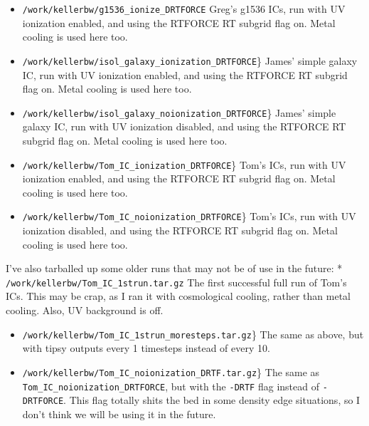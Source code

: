 \documentclass[11pt,letterpaper]{article}
\begin{document}
\begin{itemize}
\item
  \texttt{/work/kellerbw/g1536\_ionize\_DRTFORCE} Greg's g1536 ICs, run
  with UV ionization enabled, and using the RTFORCE RT subgrid flag on.
  Metal cooling is used here too.
\item
  \texttt{/work/kellerbw/isol\_galaxy\_ionization\_DRTFORCE}\} James'
  simple galaxy IC, run with UV ionization enabled, and using the
  RTFORCE RT subgrid flag on. Metal cooling is used here too.
\item
  \texttt{/work/kellerbw/isol\_galaxy\_noionization\_DRTFORCE}\} James'
  simple galaxy IC, run with UV ionization disabled, and using the
  RTFORCE RT subgrid flag on. Metal cooling is used here too.
\item
  \texttt{/work/kellerbw/Tom\_IC\_ionization\_DRTFORCE}\} Tom's ICs, run
  with UV ionization enabled, and using the RTFORCE RT subgrid flag on.
  Metal cooling is used here too.
\item
  \texttt{/work/kellerbw/Tom\_IC\_noionization\_DRTFORCE}\} Tom's ICs,
  run with UV ionization disabled, and using the RTFORCE RT subgrid flag
  on. Metal cooling is used here too.
\end{itemize}

I've also tarballed up some older runs that may not be of use in the
future: * \texttt{/work/kellerbw/Tom\_IC\_1strun.tar.gz} The first
successful full run of Tom's ICs. This may be crap, as I ran it with
cosmological cooling, rather than metal cooling. Also, UV background is
off.

\begin{itemize}
\item
  \texttt{/work/kellerbw/Tom\_IC\_1strun\_moresteps.tar.gz}\} The same
  as above, but with tipsy outputs every 1 timesteps instead of every
  10.
\item
  \texttt{/work/kellerbw/Tom\_IC\_noionization\_DRTF.tar.gz}\} The same
  as \texttt{Tom\_IC\_noionization\_DRTFORCE}, but with the
  \texttt{-DRTF} flag instead of \texttt{-DRTFORCE}. This flag totally
  shits the bed in some density edge situations, so I don't think we
  will be using it in the future.
\end{itemize}
\end{document}
